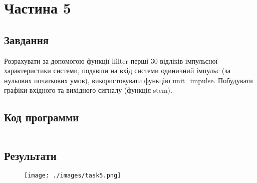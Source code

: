 \section{Частина 5}
\label{sec:task5}

\subsection{Завдання}
\label{subsec:task5_task}

Розрахувати за допомогою функції lfilter перші 30 відліків
імпульсної характеристики системи, подавши на вхід системи одиничний
імпульс (за нульових початкових умов), використовувати функцію
unit\_impulse. Побудувати графіки вхідного та вихідного сигналу (функція
stem).

\subsection{Код программи}
\label{subsec:task5_code}
\inputminted{python}{../src/task5.py}

\subsection{Результати}
\label{subsec:task5_results}

\begin{figure}[!ht]
    \centering
    \texttt{[image: ./images/task5.png]}
\end{figure}
